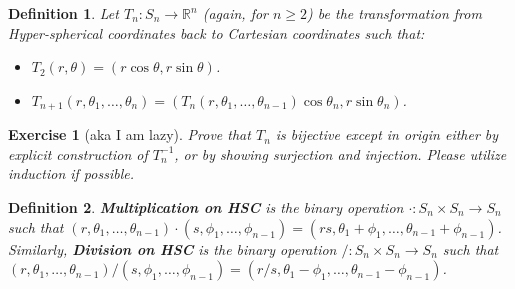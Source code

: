 \documentclass{article}
\theoremstyle{plain}
\newtheorem{definition}{Definition}[section]
\newtheorem{exercise}{Exercise}[section]
\begin{document}
\begin{definition}\label{hsc}
Let $T_n: S_n \rightarrow \mathbb{R}^n$ (again, for $n \ge 2$) be the transformation from Hyper-spherical coordinates back to Cartesian coordinates such that:
\begin{itemize}
	\item $T_2(r, \theta) = (r \cos{\theta}, r \sin{\theta})$.
	\item $T_{n+1}(r, \theta_1, \ldots, \theta_n) = (T_n(r,  \theta_1, \ldots, \theta_{n-1}) \cos{\theta_n}, r \sin{\theta_n})$.
\end{itemize}
\end{definition}

\begin{exercise}[aka I am lazy]
Prove that $T_n$ is bijective \textit{except in origin} either by explicit construction of $T_n^{-1}$, or by showing surjection and injection. Please utilize induction if possible.
\end{exercise}

\begin{definition}
\textbf{Multiplication on HSC} is the binary operation $\cdot: S_n \times S_n \rightarrow S_n$ such that $(r, \theta_1, \ldots, \theta_{n-1}) \cdot (s, \phi_1, \ldots, \phi_{n-1}) = (rs, \theta_1 + \phi_1, \ldots, \theta_{n-1} + \phi_{n-1})$. Similarly, \textbf{Division on HSC} is the binary operation $/: S_n \times S_n \rightarrow S_n$ such that $(r, \theta_1, \ldots, \theta_{n-1}) / (s, \phi_1, \ldots, \phi_{n-1}) = (r/s, \theta_1 - \phi_1, \ldots, \theta_{n-1} - \phi_{n-1})$.
\end{definition}
\end{document}
